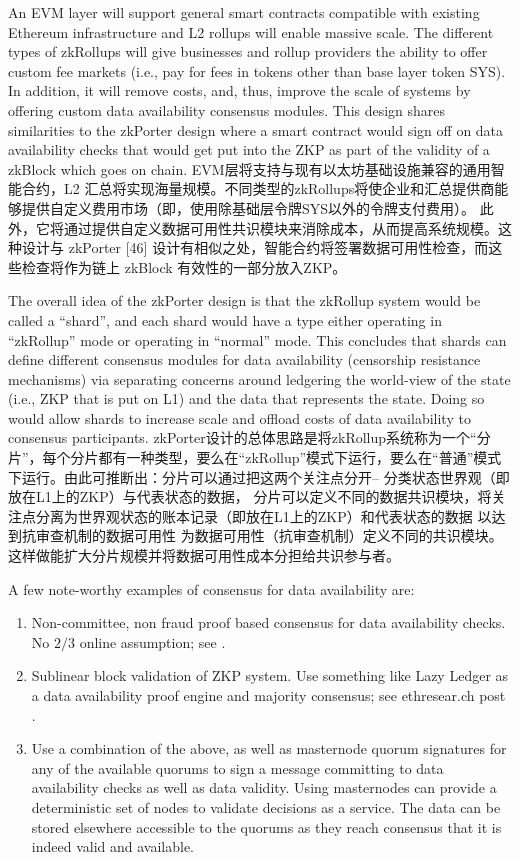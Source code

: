 \documentclass{ctexart}
\begin{document}
An EVM layer will support general smart contracts compatible with existing Ethereum infrastructure and L2 rollups will enable massive scale. The different types of zkRollups will give businesses and rollup providers the ability to offer custom fee markets (i.e., pay for fees in tokens other than base layer token SYS). In addition, it will remove costs, and, thus, improve the scale of systems by offering custom data availability consensus modules. This design shares similarities to the zkPorter \cite{matter21} design where a smart contract would sign off on data availability checks that would get put into the ZKP as part of the validity of a zkBlock which goes on chain. EVM层将支持与现有以太坊基础设施兼容的通用智能合约，L2 汇总将实现海量规模。不同类型的zkRollups将使企业和汇总提供商能够提供自定义费用市场（即，使用除基础层令牌SYS以外的令牌支付费用）。 此外，它将通过提供自定义数据可用性共识模块来消除成本，从而提高系统规模。这种设计与 zkPorter [46] 设计有相似之处，智能合约将签署数据可用性检查，而这些检查将作为链上 zkBlock 有效性的一部分放入ZKP。

The overall idea of the zkPorter design is that the zkRollup system would be called a “shard”, and each shard would have a type either operating in “zkRollup” mode or operating in “normal” mode. This concludes that shards can define different consensus modules for data availability (censorship resistance mechanisms) via separating concerns around ledgering the world-view of the state (i.e., ZKP that is put on L1) and the data that represents the state. Doing so would allow shards to increase scale and offload costs of data availability to consensus participants. zkPorter设计的总体思路是将zkRollup系统称为一个“分片”，每个分片都有一种类型，要么在“zkRollup”模式下运行，要么在“普通”模式下运行。由此可推断出：分片可以通过把这两个关注点分开-- 分类状态世界观（即放在L1上的ZKP）与代表状态的数据，
分片可以定义不同的数据共识模块，将关注点分离为世界观状态的账本记录（即放在L1上的ZKP）和代表状态的数据 以达到抗审查机制的数据可用性
为数据可用性（抗审查机制）定义不同的共识模块。这样做能扩大分片规模并将数据可用性成本分担给共识参与者。

A few note-worthy examples of consensus for data availability are:

\begin{enumerate}
\item Non-committee, non fraud proof based consensus for data availability checks. No $2/3$ online assumption; see \cite{But20}. 
\item Sublinear block validation of ZKP system. Use something like Lazy Ledger as a data availability proof engine and majority consensus; see ethresear.ch post \cite{Al20}. 
\item Use a combination of the above, as well as masternode quorum signatures for any of the available quorums to sign a message committing to data availability checks as well as data validity. Using masternodes can provide a deterministic set of nodes to validate decisions as a service. The data can be stored elsewhere accessible to the quorums as they reach consensus that it is indeed valid and available.
\end{enumerate}
\end{document}
